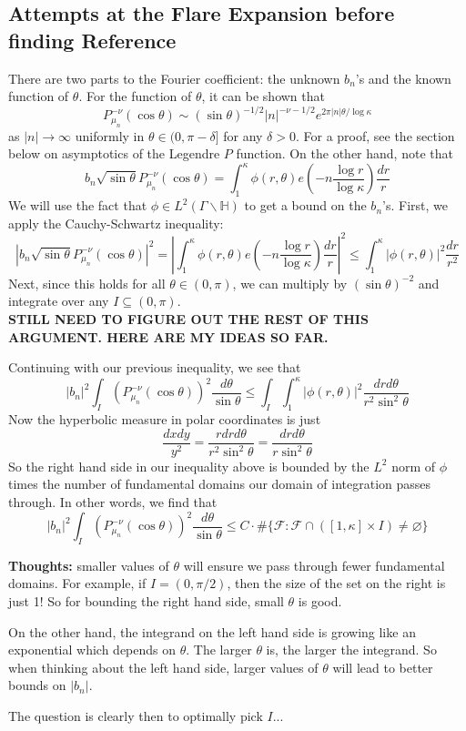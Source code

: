 \documentclass[]{article}
\begin{document}
\subsection*{Attempts at the Flare Expansion before finding Reference}

There are two parts to the Fourier coefficient: the unknown $b_n$'s and the known function of $\theta$.
For the function of $\theta$, it can be shown that
$$
P_{\mu_n}^{-\nu}(\cos\theta) \sim (\sin\theta)^{-1/2}|n|^{-\nu-1/2}e^{2\pi|n|\theta/\log\kappa}
$$
as $|n| \rightarrow \infty$ uniformly in $\theta \in (0, \pi-\delta]$ for any $\delta > 0$.
For a proof, see the section below on asymptotics of the Legendre $P$ function.
On the other hand, note that
$$
b_n\sqrt{\sin\theta}P_{\mu_n}^{-\nu}(\cos\theta) =
\int_{1}^{\kappa}\phi(r, \theta)e\left(-n\frac{\log r}{\log\kappa}\right)\frac{dr}{r}
$$
We will use the fact that $\phi \in L^2(\Gamma\backslash\mathbb{H})$ to get a bound on the $b_n$'s.
First, we apply the Cauchy-Schwartz inequality:
$$
|b_n\sqrt{\sin\theta}P_{\mu_n}^{-\nu}(\cos\theta)|^2 =
\left|\int_{1}^{\kappa}\phi(r, \theta)e\left(-n\frac{\log r}{\log\kappa}\right)\frac{dr}{r}\right|^2 \leq
\int_{1}^{\kappa}|\phi(r, \theta)|^2\frac{dr}{r^2}
$$
Next, since this holds for all $\theta \in (0, \pi)$, we can multiply by $(\sin\theta)^{-2}$ and integrate over any $I \subseteq (0, \pi)$.
\\

\textbf{STILL NEED TO FIGURE OUT THE REST OF THIS ARGUMENT. HERE ARE MY IDEAS SO FAR.}

Continuing with our previous inequality, we see that
$$
|b_n|^2\int_I \left( P_{\mu_n}^{-\nu}(\cos\theta) \right)^2\frac{d\theta}{\sin\theta} \leq
\int_I\int_{1}^{\kappa}|\phi(r, \theta)|^2\frac{drd\theta}{r^2\sin^2\theta}
$$
Now the hyperbolic measure in polar coordinates is just
$$
\frac{dxdy}{y^2} = \frac{rdrd\theta}{r^2\sin^2\theta} = \frac{drd\theta}{r\sin^2\theta}
$$
So the right hand side in our inequality above is bounded by the $L^2$ norm of $\phi$ times the number of fundamental domains our domain of integration passes through.
In other words, we find that
$$
|b_n|^2\int_I \left( P_{\mu_n}^{-\nu}(\cos\theta) \right)^2\frac{d\theta}{\sin\theta} \leq
C\cdot\#\{ \mathcal{F} : \mathcal{F} \cap ([1, \kappa]\times I) \neq \varnothing \}
$$

\textbf{Thoughts:} smaller values of $\theta$ will ensure we pass through fewer fundamental domains.
For example, if $I = (0, \pi/2)$, then the size of the set on the right is just 1!
So for bounding the right hand side, small $\theta$ is good.

On the other hand, the integrand on the left hand side is growing like an exponential which depends on $\theta$.
The larger $\theta$ is, the larger the integrand.
So when thinking about the left hand side, larger values of $\theta$ will lead to better bounds on $|b_n|$.

The question is clearly then to optimally pick $I$...
	
\end{document}
